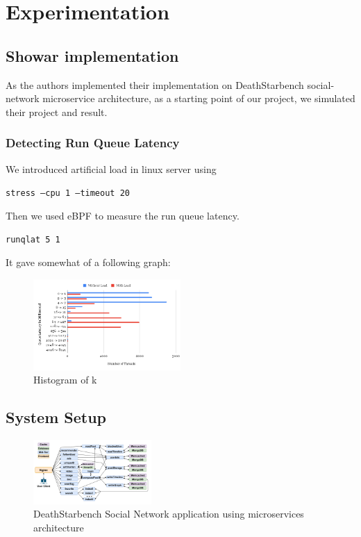 \documentclass[conference]{IEEEtran}
\begin{document}
\section{Experimentation}

\subsection{Showar\cite{bShowar} implementation}

As the authors implemented their implementation on DeathStarbench social-network microservice architecture, as a starting point of our project, we simulated their project and result.

\subsubsection{Detecting Run Queue Latency}

We introduced artificial load in linux server using 

\texttt{stress --cpu  1 --timeout 20}

Then we used eBPF to measure the run queue latency.

\texttt{runqlat 5 1}

It gave somewhat of a following graph:

\begin{figure}[!h]
    \begin{center}
        \includegraphics[width=0.5\textwidth]{figures/runqlat.png}
    \end{center}
    \caption{Histogram of k}
    \label{fig:}
\end{figure}


\subsection{System Setup}

\begin{figure}[!h]
    \begin{center}
        \includegraphics[width=0.4\textwidth]{figures/social-network.png}
    \end{center}
    \caption{DeathStarbench\cite{bDeathStarBench} Social Network application using microservices architecture}
    \label{fig:social-network}
\end{figure}
\end{document}
